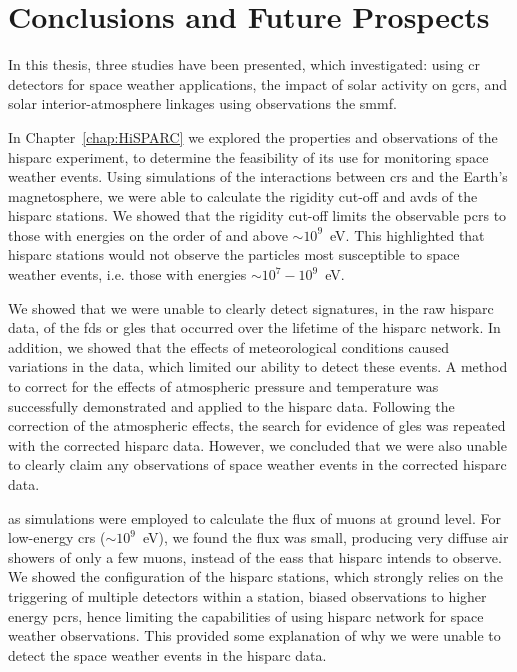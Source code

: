 \chapter{Conclusions and Future Prospects}\label{chap:conc}

In this thesis, three studies have been presented, which investigated: using \gls{cr} detectors for space weather applications, the impact of solar activity on \glspl{gcr}, and solar interior-atmosphere linkages using observations the \gls{smmf}. %

In Chapter~\ref{chap:HiSPARC} we explored the properties and observations of the \gls{hisparc} experiment, to determine the feasibility of its use for monitoring space weather events. Using simulations of the interactions between \glspl{cr} and the Earth's magnetosphere, we were able to calculate the rigidity cut-off and \glspl{avd} of the \gls{hisparc} stations. We showed that the rigidity cut-off limits the observable \glspl{pcr} to those with energies on the order of and above $\sim 10^9$~eV. This highlighted that \gls{hisparc} stations would not observe the particles most susceptible to space weather events, i.e. those with energies $\sim 10^7-10^9$~eV.

We showed that we were unable to clearly detect signatures, in the raw \gls{hisparc} data, of the \glspl{fd} or \glspl{gle} that occurred over the lifetime of the \gls{hisparc} network. In addition, we showed that the effects of meteorological conditions caused variations in the data, which limited our ability to detect these events. A method to correct for the effects of atmospheric pressure and temperature was successfully demonstrated and applied to the \gls{hisparc} data. Following the correction of the atmospheric effects, the search for evidence of \glspl{gle} was repeated with the corrected \gls{hisparc} data. However, we concluded that we were also unable to clearly claim any observations of space weather events in the corrected \gls{hisparc} data.

\gls{as} simulations were employed to calculate the flux of muons at ground level. For low-energy \glspl{cr} ($\sim 10^9$~eV), we found the flux was small, producing very diffuse air showers of only a few muons, instead of the \glspl{eas} that \gls{hisparc} intends to observe. We showed the configuration of the \gls{hisparc} stations, which strongly relies on the triggering of multiple detectors within a station, biased observations to higher energy \glspl{pcr}, hence limiting the capabilities of using \gls{hisparc} network for space weather observations. This provided some explanation of why we were unable to detect the space weather events in the \gls{hisparc} data.


